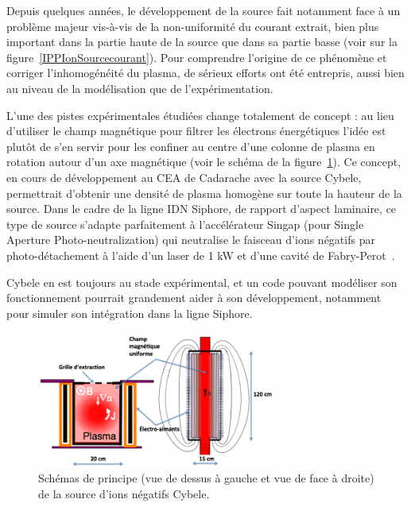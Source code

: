 \begin{refsection}
Depuis quelques années, le développement de la source fait notamment 
face à un problème majeur vis-à-vis de la non-uniformité du courant extrait, bien plus
important dans la partie haute de la source que dans sa partie basse (voir sur la
figure~\ref{IPPIonSourcecourant}). 
Pour comprendre l'origine de ce phénomène et corriger l'inhomogénéité du plasma,
de sérieux efforts ont été entrepris, aussi bien au niveau de la modélisation que
de l'expérimentation. 

L'une des pistes expérimentales étudiées change totalement de concept : au
lieu d'utiliser le champ magnétique pour filtrer les électrons énergétiques
l'idée est plutôt de s'en servir pour les confiner au centre d'une colonne de
plasma en rotation autour d'un axe magnétique (voir le schéma de la
figure~\ref{CYBELEIonSource}). Ce concept, en cours de développement au CEA de Cadarache avec la source Cybele, permettrait
d'obtenir une densité de plasma homogène sur toute la hauteur de la source. Dans
le cadre de la ligne IDN Siphore, de rapport d'aspect laminaire, ce type de
source s'adapte parfaitement à l'accélérateur Singap (pour Single Aperture
Photo-neutralization) qui neutralise le faisceau d'ions négatifs par
photo-détachement à l'aide d'un laser de 1 kW et d'une cavité de
Fabry-Perot~\parencite{SimoninHDR}.

Cybele en est toujours au stade expérimental, et un
code pouvant modéliser son fonctionnement pourrait grandement aider à son
développement, notamment pour simuler son intégration dans la ligne Siphore.

\begin{figure}[htbp]
\centering
\includegraphics[width=0.7\textwidth]{figures/sourceSimonin1.png}
{\caption{Schémas de principe (vue de dessus à gauche et vue de face à droite)
de la source d'ions négatifs Cybele.}\label{CYBELEIonSource}}
\end{figure}



\end{refsection}
